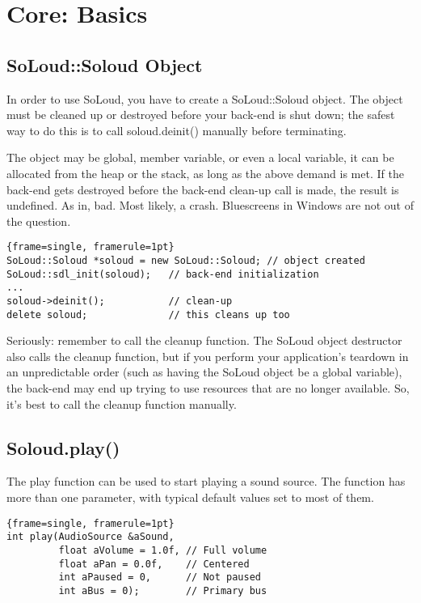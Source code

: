 
\chapter{Core: Basics}

\section{SoLoud::Soloud Object}

In order to use SoLoud, you have to create a SoLoud::Soloud object. The object must be cleaned up or destroyed before your back-end is shut down; the safest way to do this is to call soloud.deinit() manually before terminating.

The object may be global, member variable, or even a local variable, it can be allocated from the heap or the stack, as long as the above demand is met. If the back-end gets destroyed before the back-end clean-up call is made, the result is undefined. As in, bad. Most likely, a crash. Bluescreens in Windows are not out of the question.

\begin{lstlisting}{frame=single, framerule=1pt}
SoLoud::Soloud *soloud = new SoLoud::Soloud; // object created
SoLoud::sdl_init(soloud);   // back-end initialization
...
soloud->deinit();           // clean-up
delete soloud;              // this cleans up too
\end{lstlisting}

Seriously: remember to call the cleanup function. The SoLoud object destructor also calls the cleanup function, but if you perform your application's teardown in an unpredictable order (such as having the SoLoud object be a global variable), the back-end may end up trying to use resources that are no longer available. So, it's best to call the cleanup function manually.

\section{Soloud.play()}

The play function can be used to start playing a sound source. The function has more than one parameter, with typical default values set to most of them.

\begin{lstlisting}{frame=single, framerule=1pt}
int play(AudioSource &aSound, 
         float aVolume = 1.0f, // Full volume 
         float aPan = 0.0f,    // Centered
         int aPaused = 0,      // Not paused
         int aBus = 0);        // Primary bus
\end{lstlisting}

